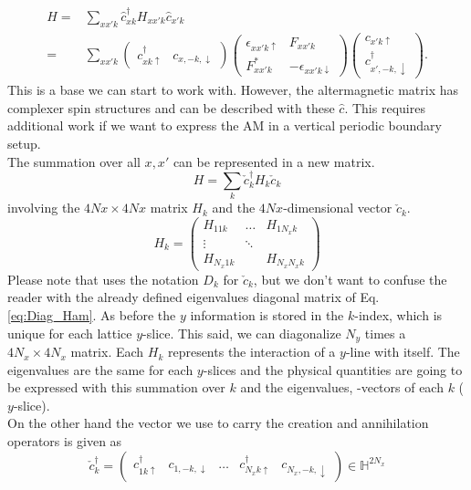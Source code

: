\documentclass[../main.tex]{subfile}
\begin{document}
\begin{equation}
    \begin{aligned}
    H =& \sum_{xx'k} \hat{c}_{xk}^{\dagger} H_{xx'k} \hat{c}_{x'k}\\
      =& \sum_{xx'k} \begin{pmatrix}
        c^{\dagger}_{xk\uparrow} & c_{x,-k,\downarrow}
      \end{pmatrix}
        \begin{pmatrix}
            \epsilon_{xx'k\uparrow} & F_{xx'k}\\
            F_{xx'k}^{\ast} & -\epsilon_{xx'k\downarrow}
        \end{pmatrix}
        \begin{pmatrix}
            c_{x'k\uparrow}\\
            c^{\dagger}_{x',-k,\downarrow}
        \end{pmatrix}.
    \end{aligned}
\end{equation}
This is a base we can start to work with. However, the altermagnetic matrix has complexer spin structures and can be described with these $\hat{c}$.
This requires additional work if we want to express the AM in a vertical periodic boundary setup.\\
The summation over all $x,x'$ can be represented in a new matrix.
\[
    H = \sum_k \check{c}_k^{\dagger} H_k \check{c}_k
\]
involving the $4Nx \times 4Nx$ matrix $H_k$ and the $4Nx$-dimensional vector $\check{c}_k$. 
\[
    H_k = \begin{pmatrix}
        H_{11k} &\dots & H_{1N_xk}\\
        \vdots&\ddots&\\
        H_{N_x1k} & & H_{N_xN_xk}
    \end{pmatrix}
\]
Please note that \cite{Mjos2019} uses the notation $D_k$ for $\check{c}_k$, but we don't want to confuse the reader with the already defined eigenvalues
 diagonal matrix of Eq.\ref{eq:Diag_Ham}.
As before the $y$ information is stored in the $k$-index, which is unique for each lattice $y$-slice. This said, we 
can diagonalize $N_y$ times a $4N_x \times 4N_x$ matrix. Each $H_k$ represents the interaction of a $y$-line with itself.
The eigenvalues are the same for each $y$-slices and the physical
quantities are going to be expressed with this summation over $k$ and the eigenvalues, -vectors of each $k$ ($y$-slice).\\

On the other hand the vector we use to carry the creation and annihilation operators is given as 
\[
    \check{c}_k^{\dagger} = \begin{pmatrix}
        c^{\dagger}_{1k\uparrow} & c_{1,-k,\downarrow}& \dots &c^{\dagger}_{N_x k\uparrow} & c_{N_x,-k,\downarrow}
    \end{pmatrix}\in\mathbb{H}^{2N_x}
\]
\end{document}
